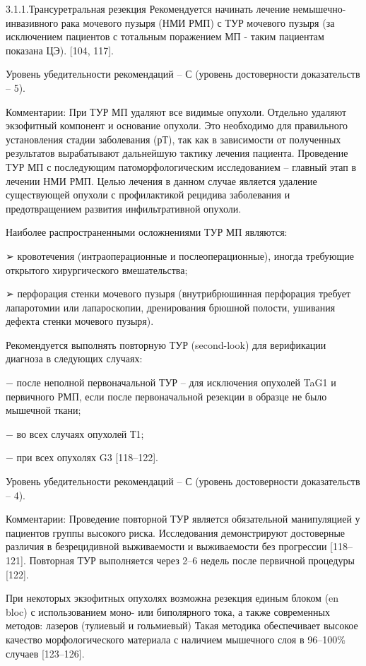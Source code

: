 3.1.1.Трансуретральная резекция
Рекомендуется начинать лечение немышечно-инвазивного рака мочевого пузыря (НМИ РМП) с ТУР мочевого пузыря (за исключением пациентов с тотальным поражением МП - таким пациентам показана ЦЭ). [104, 117].

Уровень убедительности рекомендаций – С (уровень достоверности доказательств – 5).

Комментарии: При ТУР МП удаляют все видимые опухоли. Отдельно удаляют экзофитный компонент и основание опухоли. Это необходимо для правильного установления стадии заболевания (рТ), так как в зависимости от полученных результатов вырабатывают дальнейшую тактику лечения пациента. Проведение ТУР МП с последующим патоморфологическим исследованием – главный этап в лечении НМИ РМП. Целью лечения в данном случае является удаление существующей опухоли с профилактикой рецидива заболевания и предотвращением развития инфильтративной опухоли.

Наиболее распространенными осложнениями ТУР МП являются:

➢ кровотечения (интраоперационные и послеоперационные), иногда требующие открытого хирургического вмешательства;

➢ перфорация стенки мочевого пузыря (внутрибрюшинная перфорация требует лапаротомии или лапароскопии, дренирования брюшной полости, ушивания дефекта стенки мочевого пузыря).

Рекомендуется выполнять повторную ТУР (second-look) для верификации диагноза в следующих случаях:

− после неполной первоначальной ТУР – для исключения опухолей TaG1 и первичного РМП, если после первоначальной резекции в образце не было мышечной ткани;

− во всех случаях опухолей Т1;

− при всех опухолях G3 [118–122].

Уровень убедительности рекомендаций – С (уровень достоверности доказательств – 4).

Комментарии: Проведение повторной ТУР является обязательной манипуляцией у пациентов группы высокого риска. Исследования демонстрируют достоверные различия в безрецидивной выживаемости и выживаемости без прогрессии [118–121]. Повторная ТУР выполняется через 2–6 недель после первичной процедуры [122].

При некоторых экзофитных опухолях возможна резекция единым блоком (en bloc) с использованием моно- или биполярного тока, а также современных методов: лазеров (тулиевый и гольмиевый) Такая методика обеспечивает высокое качество морфологического материала с наличием мышечного слоя в 96–100\% случаев [123–126].

